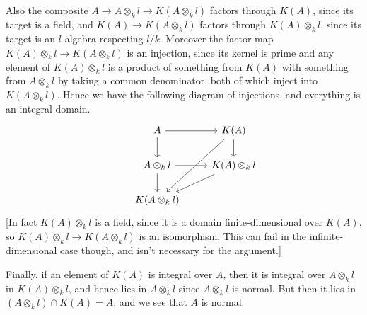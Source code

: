 \documentclass{report}
\begin{document}
\begin{enumerate}[label=\textbf{5.4.\Alph*.}]
	      Also the composite $A\to A\otimes_kl\to K(A\otimes_kl)$ factors through
	      $K(A)$, since its target is a field, and $K(A)\to K(A\otimes_kl)$
	      factors through $K(A)\otimes_kl$, since its target is an $l$-algebra
	      respecting $l/k$. Moreover the factor map
	      $K(A)\otimes_kl\to K(A\otimes_kl)$ is an injection, since its kernel is
	      prime and any element of $K(A)\otimes_kl$ is a product of something from
	      $K(A)$ with something from $A\otimes_kl$ by taking a common
	      denominator, both of which inject into $K(A\otimes_kl)$. Hence we have
	      the following diagram of injections, and everything is an integral
	      domain.
	      \begin{equation*}
		      \begin{tikzcd}
			      &A \arrow{r} \arrow{d}
			      &K(A) \arrow{d} \arrow{ddl} \\
			      &A\otimes_kl \arrow{r} \arrow{d}
			      &K(A)\otimes_kl \arrow{dl} \\
			      &K(A\otimes_kl)
			      &
		      \end{tikzcd}
	      \end{equation*}
	      [In fact $K(A)\otimes_kl$ is a field, since it is a domain
	      finite-dimensional over $K(A)$, so $K(A)\otimes_kl\to K(A\otimes_kl)$ is
	      an isomorphism. This can fail in the infinite-dimensional case though,
	      and isn't necessary for the argument.]

	      Finally, if an element of $K(A)$ is integral over $A$, then it is
	      integral over $A\otimes_kl$ in $K(A)\otimes_kl$, and hence lies in
	      $A\otimes_kl$ since $A\otimes_kl$ is normal. But then it lies in
	      $(A\otimes_kl)\cap K(A)=A$, and we see that $A$ is normal.


\end{enumerate}
\end{document}
